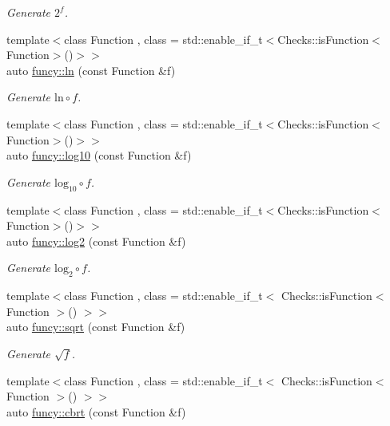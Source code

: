 \begin{DoxyCompactItemize}
\begin{DoxyCompactList}\small\item\em Generate $2^f$. \end{DoxyCompactList}\item 
{\footnotesize template$<$class Function , class  = std\-::enable\-\_\-if\-\_\-t$<$\-Checks\-::is\-Function$<$\-Function$>$()$>$$>$ }\\auto \hyperlink{group__CMathGroup_gaa1ca40e2b0c36709978b91836435b0c5}{funcy\-::ln} (const Function \&f)
\begin{DoxyCompactList}\small\item\em Generate $ \mathrm{ln}\circ f $. \end{DoxyCompactList}\item 
{\footnotesize template$<$class Function , class  = std\-::enable\-\_\-if\-\_\-t$<$\-Checks\-::is\-Function$<$\-Function$>$()$>$$>$ }\\auto \hyperlink{group__CMathGroup_ga29cb2c4b2fb13040a351e685fc3f8b03}{funcy\-::log10} (const Function \&f)
\begin{DoxyCompactList}\small\item\em Generate $ \mathrm{log}_{10}\circ f $. \end{DoxyCompactList}\item 
{\footnotesize template$<$class Function , class  = std\-::enable\-\_\-if\-\_\-t$<$\-Checks\-::is\-Function$<$\-Function$>$()$>$$>$ }\\auto \hyperlink{group__CMathGroup_gab619c71bd55d049c827d8f2af2a939d3}{funcy\-::log2} (const Function \&f)
\begin{DoxyCompactList}\small\item\em Generate $ \mathrm{log}_{2}\circ f $. \end{DoxyCompactList}\item 
{\footnotesize template$<$class Function , class  = std\-::enable\-\_\-if\-\_\-t$<$ Checks\-::is\-Function$<$ Function $>$() $>$$>$ }\\auto \hyperlink{group__CMathGroup_ga1c180bd87b8817342b34d72dddd11266}{funcy\-::sqrt} (const Function \&f)
\begin{DoxyCompactList}\small\item\em Generate $ \sqrt{f} $. \end{DoxyCompactList}\item 
{\footnotesize template$<$class Function , class  = std\-::enable\-\_\-if\-\_\-t$<$ Checks\-::is\-Function$<$ Function $>$() $>$$>$ }\\auto \hyperlink{group__CMathGroup_gae8e97f84bd4000935069a87133173d4c}{funcy\-::cbrt} (const Function \&f)

\end{DoxyCompactItemize}
